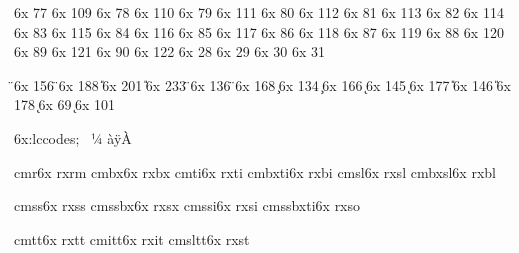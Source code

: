 \characterdef \CYRNJE       6x  77
\characterdef \cyrnje       6x  109
\characterdef \CYRABHHA     6x  78
\characterdef \cyrabhha     6x  110
\characterdef \CYRPHK       6x  79
\characterdef \cyrphk       6x  111
\characterdef \CYRRDSC      6x  80
\characterdef \cyrrdsc      6x  112
\characterdef \CYRQ         6x  81
\characterdef \cyrq         6x  113
\characterdef \CYRTDSC      6x  82
\characterdef \cyrtdsc      6x  114
\characterdef \CYRDZE       6x  83
\characterdef \cyrdze       6x  115
\characterdef \CYRTETSE     6x  84
\characterdef \cyrtetse     6x  116
\characterdef \CYRDZHE      6x  85
\characterdef \cyrdzhe      6x  117
\characterdef \CYRCHVCRS    6x  86
\characterdef \cyrchvcrs    6x  118
\characterdef \CYRW         6x  87
\characterdef \cyrw         6x  119
\characterdef \CYRYAT       6x  88
\characterdef \cyryat       6x  120
\characterdef \CYRBYUS      6x  89
\characterdef \cyrbyus      6x  121
\characterdef \CYRIZH       6x  90
\characterdef \cyrizh       6x  122
\characterdef \CYRDELTA     6x  28
\characterdef \cyrdelta     6x  29
\characterdef \CYRNLHK      6x  30
\characterdef \cyrnlhk      6x  31

\accentdef \"  \CYRE       6x  156
\accentdef \"  \cyre       6x  188
\accentdef \U  \CYRI       6x  201
\accentdef \U  \cyri       6x  233
\accentdef \"  \CYRII      6x  136
\accentdef \"  \cyrii      6x  168
\accentdef \c  \CYRZ       6x  134
\accentdef \c  \cyrz       6x  166
\accentdef \k  \CYRS       6x  145
\accentdef \k  \cyrs       6x  177
\accentdef \U  \CYRU       6x  146
\accentdef \U  \cyru       6x  178
\accentdef \k  \CYRABHCH   6x  69
\accentdef \k  \cyrabhch   6x  101


\modifydef 6x:lccodes; {%
   \skipfirststep
   \lccodesloop ^^a0^^bc^^80%
   \lccodesloop ^^e0^^ff^^c0%
   \def\lccodesback {\zerolccodes ^^80^^ff}%
}



\registerECfont    cmr6x       rxrm %
\registerECfont    cmbx6x      rxbx %
\registerECfont    cmti6x      rxti %
\registerECfont    cmbxti6x    rxbi %
\registerECfont    cmsl6x      rxsl %
\registerECfont    cmbxsl6x    rxbl %

\registerECfont    cmss6x      rxss %
\registerECfont    cmssbx6x    rxsx %
\registerECfont    cmssi6x     rxsi %
\registerECfont    cmssbxti6x  rxso %

\registerECTTfont  cmtt6x      rxtt %
\registerECTTfont  cmitt6x     rxit %
\registerECTTfont  cmsltt6x    rxst %





